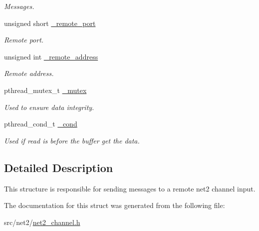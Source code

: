 \begin{DoxyCompactItemize}
\begin{DoxyCompactList}\small\item\em Messages. \end{DoxyCompactList}\item 
\hypertarget{structnet2__channel__output__t_a7236b85d69d9c17a6d11d830c191096a}{unsigned short \hyperlink{structnet2__channel__output__t_a7236b85d69d9c17a6d11d830c191096a}{\-\_\-remote\-\_\-port}}\label{structnet2__channel__output__t_a7236b85d69d9c17a6d11d830c191096a}

\begin{DoxyCompactList}\small\item\em Remote port. \end{DoxyCompactList}\item 
\hypertarget{structnet2__channel__output__t_aed3ee28ef3dd928ad8735a44187e6016}{unsigned int \hyperlink{structnet2__channel__output__t_aed3ee28ef3dd928ad8735a44187e6016}{\-\_\-remote\-\_\-address}}\label{structnet2__channel__output__t_aed3ee28ef3dd928ad8735a44187e6016}

\begin{DoxyCompactList}\small\item\em Remote address. \end{DoxyCompactList}\item 
\hypertarget{structnet2__channel__output__t_a440374b4242121a1dafbe2f457264b15}{pthread\-\_\-mutex\-\_\-t \hyperlink{structnet2__channel__output__t_a440374b4242121a1dafbe2f457264b15}{\-\_\-mutex}}\label{structnet2__channel__output__t_a440374b4242121a1dafbe2f457264b15}

\begin{DoxyCompactList}\small\item\em Used to ensure data integrity. \end{DoxyCompactList}\item 
\hypertarget{structnet2__channel__output__t_ab87a0f05e9a6580b15fb5e9fc21e2142}{pthread\-\_\-cond\-\_\-t \hyperlink{structnet2__channel__output__t_ab87a0f05e9a6580b15fb5e9fc21e2142}{\-\_\-cond}}\label{structnet2__channel__output__t_ab87a0f05e9a6580b15fb5e9fc21e2142}

\begin{DoxyCompactList}\small\item\em Used if read is before the buffer get the data. \end{DoxyCompactList}\end{DoxyCompactItemize}


\subsection{Detailed Description}
This structure is responsible for sending messages to a remote net2 channel input. 

The documentation for this struct was generated from the following file\-:\begin{DoxyCompactItemize}
\item 
src/net2/\hyperlink{net2__channel_8h}{net2\-\_\-channel.\-h}\end{DoxyCompactItemize}
